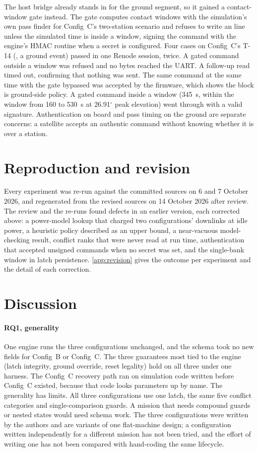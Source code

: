 \documentclass[preprint,12pt]{elsarticle}
\newcommand{\cfgB}{Config~B}
\newcommand{\cfgC}{Config~C}
\begin{document}
The host bridge already stands in for the ground segment, so it gained a contact-window gate instead. The gate computes contact windows with the simulation's own pass finder for \cfgC{}'s two-station scenario and refuses to write an  line unless the simulated time is inside a window, signing the command with the engine's HMAC routine when a secret is configured. Four cases on \cfgC{}'s T-14 (, a ground event) passed in one Renode session, twice. A gated command outside a window was refused and no bytes reached the UART. A follow-up read timed out, confirming that nothing was sent. The same command at the same time with the gate bypassed was accepted by the firmware, which shows the block is ground-side policy. A gated command inside a window (345~s, within the window from 160 to 530~s at 26.91$^\circ$ peak elevation) went through with a valid signature. Authentication on board and pass timing on the ground are separate concerns: a satellite accepts an authentic command without knowing whether it is over a station.

\section{Reproduction and revision}\label{sec:rerun}

Every experiment was re-run against the committed sources on 6 and 7 October 2026, and regenerated from the revised sources on 14 October 2026 after review. The review and the re-runs found defects in an earlier version, each corrected above: a power-model lookup that charged two configurations' downlinks at idle power, a heuristic policy described as an upper bound, a near-vacuous model-checking result, conflict ranks that were never read at run time, authentication that accepted unsigned commands when no secret was set, and the single-bank window in latch persistence. \ref{app:revision} gives the outcome per experiment and the detail of each correction.

\section{Discussion}\label{sec:discussion}

\paragraph{RQ1, generality} One engine runs the three configurations unchanged, and the schema took no new fields for \cfgB{} or \cfgC{}. The three guarantees most tied to the engine (latch integrity, ground override, reset legality) hold on all three under one harness. The \cfgC{} recovery path ran on simulation code written before \cfgC{} existed, because that code looks parameters up by name. The generality has limits. All three configurations use one latch, the same five conflict categories and single-comparison guards. A mission that needs compound guards or nested states would need schema work. The three configurations were written by the authors and are variants of one flat-machine design; a configuration written independently for a different mission has not been tried, and the effort of writing one has not been compared with hand-coding the same lifecycle.
\end{document}
